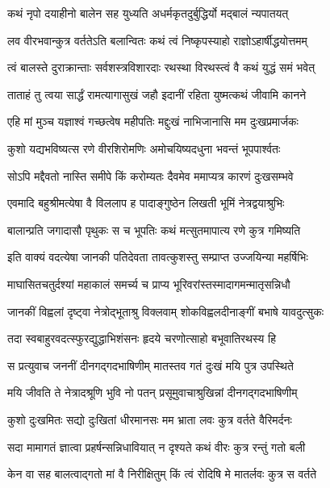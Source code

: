 
\twolineshloka
{कथं नृपो दयाहीनो बालेन सह युध्यति}
{अधर्मकृतदुर्बुद्धिर्यो मद्बालं न्यपातयत्}%

\twolineshloka
{लव वीरभवान्कुत्र वर्ततेऽति बलान्वितः}
{कथं त्वं निष्कृपस्याहो राज्ञोऽहार्षीद्धयोत्तमम्}%

\twolineshloka
{त्वं बालस्ते दुराक्रान्ताः सर्वशस्त्रविशारदाः}
{रथस्था विरथस्त्वं वै कथं युद्धं समं भवेत्}%

\twolineshloka
{ताताहं तु त्वया सार्द्धं रामत्यागासुखं जहौ}
{इदानीं रहिता युष्मत्कथं जीवामि कानने}%

\twolineshloka
{एहि मां मुञ्च यज्ञाश्वं गच्छत्वेष महीपतिः}
{मद्दुःखं नाभिजानासि मम दुःखप्रमार्जकः}%

\twolineshloka
{कुशो यद्यभविष्यत्स रणे वीरशिरोमणिः}
{अमोचयिष्यदधुना भवन्तं भूपपार्श्वतः}%

\twolineshloka
{सोऽपि मद्दैवतो नास्ति समीपे किं करोम्यतः}
{दैवमेव ममाप्यत्र कारणं दुःखसम्भवे}%

\twolineshloka
{एवमादि बहुश्रीमत्येषा वै विललाप ह}
{पादाङ्गुष्ठेन लिखती भूमिं नेत्रद्वयाश्रुभिः}%

\twolineshloka
{बालान्प्रति जगादासौ पृथुकः स च भूपतिः}
{कथं मत्सुतमापात्य रणे कुत्र गमिष्यति}%

\twolineshloka
{इति वाक्यं वदत्येषा जानकी पतिदेवता}
{तावत्कुशस्तु सम्प्राप्त उज्जयिन्या महर्षिभिः}%

\twolineshloka
{माघासितचतुर्दश्यां महाकालं समर्च्य च}
{प्राप्य भूरिवरांस्तस्मादागमन्मातृसन्निधौ}%

\twolineshloka
{जानकीं विह्वलां दृष्ट्वा नेत्रोद्भूताश्रु विक्लवाम्}
{शोकविह्वलदीनाङ्गीं बभाषे यावदुत्सुकः}%

\twolineshloka
{तदा स्वबाहुरवदत्स्फुरद्युद्धाभिशंसनः}
{हृदये चरणोत्साहो बभूवातिरथस्य हि}%

\twolineshloka
{स प्रत्युवाच जननीं दीनगद्गदभाषिणीम्}
{मातस्तव गतं दुःखं मयि पुत्र उपस्थिते}%

\twolineshloka
{मयि जीवति ते नेत्रादश्रूणि भुवि नो पतन्}
{प्रसूमुवाचाश्रुखिन्नां दीनगद्गदभाषिणीम्}%

\twolineshloka
{कुशो दुःखमितः सद्यो दुःखितां धीरमानसः}
{मम भ्राता लवः कुत्र वर्तते वैरिमर्दनः}%

\twolineshloka
{सदा मामागतं ज्ञात्वा प्रहर्षन्सन्निधावियात्}
{न दृश्यते कथं वीरः कुत्र रन्तुं गतो बली}%

\twolineshloka
{केन वा सह बालत्वाद्गतो मां वै निरीक्षितुम्}
{किं त्वं रोदिषि मे मातर्लवः कुत्र स वर्तते}%

